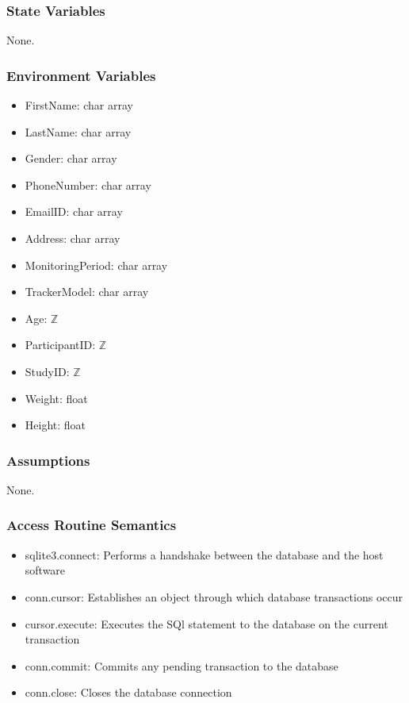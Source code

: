 \documentclass[12pt, titlepage]{article}
\begin{document}
\subsubsection{State Variables}

None.

\subsubsection{Environment Variables}

\begin{itemize}
\item FirstName: char array
\item LastName: char array
\item Gender: char array
\item PhoneNumber: char array
\item EmailID: char array
\item Address: char array
\item MonitoringPeriod: char array
\item TrackerModel: char array
\item Age: $\mathbb{Z}$
\item ParticipantID: $\mathbb{Z}$
\item StudyID: $\mathbb{Z}$
\item Weight: float
\item Height: float
\end{itemize}

\subsubsection{Assumptions}
None.
\subsubsection{Access Routine Semantics}
\begin{itemize}
\item sqlite3.connect: Performs a handshake between the database and the host software
\item conn.cursor: Establishes an object through which database transactions occur
\item cursor.execute: Executes the SQl statement to the database on the current transaction
\item conn.commit: Commits any pending transaction to the database
\item conn.close: Closes the database connection

\end{itemize}
\end{document}
